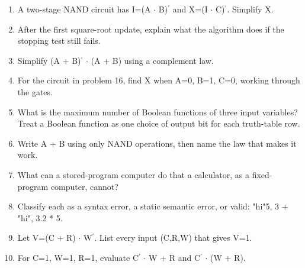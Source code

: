 \documentclass[11pt]{article}
\begin{document}
\begin{keepsection}
\begin{enumerate}
\item A two-stage NAND circuit has I=(A \ensuremath{\cdot} B)\ensuremath{{}^{\prime}} and X=(I \ensuremath{\cdot} C)\ensuremath{{}^{\prime}}. Simplify X.
\item After the first square-root update, explain what the algorithm does if the stopping test still fails.
\item Simplify (A + B)\ensuremath{{}^{\prime}} \ensuremath{\cdot} (A + B) using a complement law.
\item For the circuit in problem 16, find X when A=0, B=1, C=0, working through the gates.
\item What is the maximum number of Boolean functions of three input variables? Treat a Boolean function as one choice of output bit for each truth-table row.
\item Write A + B using only NAND operations, then name the law that makes it work.
\item What can a stored-program computer do that a calculator, as a fixed-program computer, cannot?
\item Classify each as a syntax error, a static semantic error, or valid: "hi"5, 3 + "hi", 3.2 * 5.
\item Let V=(C + R) \ensuremath{\cdot} W\ensuremath{{}^{\prime}}. List every input (C,R,W) that gives V=1.
\item For C=1, W=1, R=1, evaluate C\ensuremath{{}^{\prime}} \ensuremath{\cdot} W + R and C\ensuremath{{}^{\prime}} \ensuremath{\cdot} (W + R).
\end{enumerate}

\end{keepsection}
\end{document}
